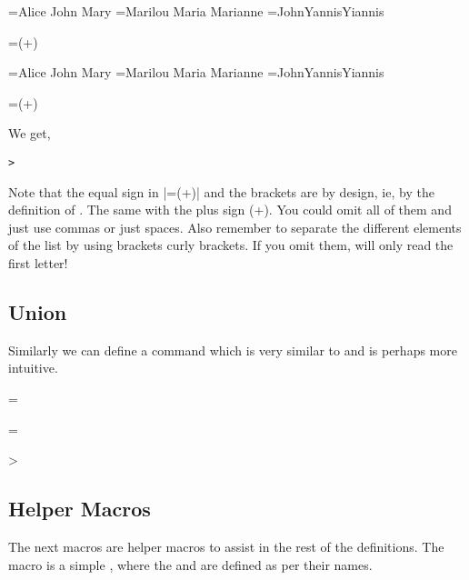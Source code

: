 \begin{teXX}
={{Alice }{John }{Mary }}
={{Marilou }{Maria }{Marianne }}
={{John}{Yannis}{Yiannis}}

\newtoks\result
\JoinToks\result=(+)
\the\result
\end{teXX}


={{Alice }{John }{Mary }}
={{Marilou }{Maria }{Marianne }}
={{John}{Yannis}{Yiannis}}

\newtoks\result
\JoinToks\result=(+)

\noindent We get,

\noindent \texttt{> \the\result}

Note that the equal sign in |\JoinToks\result=(+)| and the brackets are by design, ie, by the definition of . The same with the plus sign (+). You could omit all of them and just use commas or just spaces. Also remember to separate the different elements of the list by using brackets curly brackets. If you omit them, \tex will only read the first letter!

\subsection*{Union}
Similarly we can define a command  which is very similar to  and is perhaps more intuitive.


\begin{teX}
%
\def\Union(#1,#2){\expandafter\expandafter\expandafter
{\expandafter\the\expandafter#1\the#2}}
=\Union(,) 
\end{teX}
%
\def\Union(#1,#2){\expandafter\expandafter\expandafter
{\expandafter\the\expandafter#1\the#2}}

=\Union(,) 

> \texttt{\the{}}



\subsection{Helper Macros}
The next macros are helper macros to assist in the rest of the definitions. The  macro is a simple , where the  and  are defined as per their names.

